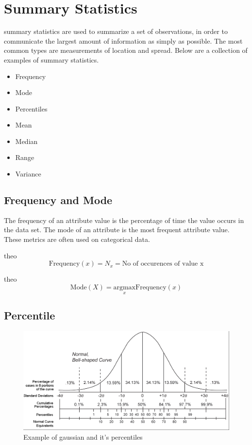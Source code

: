 \section{Summary Statistics}
summary statistics are used to summarize a set of observations, in order to 
communicate the largest amount of information as simply as possible. The most 
common types are measurements of location and spread. Below are a collection of
examples of summary statistics.

\begin{itemize}
    \item Frequency
    \item Mode
    \item Percentiles
    \item Mean
    \item Median
    \item Range
    \item Variance
\end{itemize}

\subsection{Frequency and Mode}
The frequency of an attribute value is the percentage of time the value occurs 
in the data set. The mode of an attribute is the most frequent attribute value.
These metrics are often used on categorical data. 

\begin{theo}[Frequency]{theo}
    \label{eq:Frequency}
        \[
            \text{Frequency}(x) = N_x = \text{No of occurences of value x}
        \]
\end{theo}

\begin{theo}[Mode]{theo}
    \label{eq:Mode}
        \[
            \text{Mode}(X) = \underset{x}{\mathrm{arg max} } \text{Frequency}(x)
        \]
\end{theo}

\subsection{Percentile}

\begin{figure}
    \centering
    \includegraphics[width=\textwidth]{figures/percentile.PNG}
    \caption{Example of gaussian and it's percentiles}
    \label{fig:percentile}
\end{figure}

